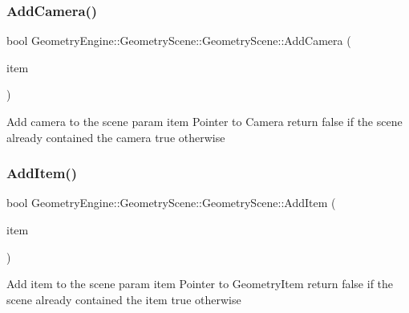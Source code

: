 \subsubsection{\texorpdfstring{AddCamera()}{AddCamera()}}
{\footnotesize\ttfamily bool Geometry\+Engine\+::\+Geometry\+Scene\+::\+Geometry\+Scene\+::\+Add\+Camera (\begin{DoxyParamCaption}\item[{\mbox{\hyperlink{class_geometry_engine_1_1_geometry_world_item_1_1_geometry_camera_1_1_camera}{Geometry\+World\+Item\+::\+Geometry\+Camera\+::\+Camera}} $\ast$}]{item }\end{DoxyParamCaption})\hspace{0.3cm}{\ttfamily [virtual]}}

Add camera to the scene param item Pointer to Camera return false if the scene already contained the camera true otherwise \mbox{\label{class_geometry_engine_1_1_geometry_scene_1_1_geometry_scene_a31a1d878b18e5e9fe4cc4aebeb3de415}} 
\subsubsection{\texorpdfstring{AddItem()}{AddItem()}}
{\footnotesize\ttfamily bool Geometry\+Engine\+::\+Geometry\+Scene\+::\+Geometry\+Scene\+::\+Add\+Item (\begin{DoxyParamCaption}\item[{\mbox{\hyperlink{class_geometry_engine_1_1_geometry_world_item_1_1_geometry_item_1_1_geometry_item}{Geometry\+World\+Item\+::\+Geometry\+Item\+::\+Geometry\+Item}} $\ast$}]{item }\end{DoxyParamCaption})\hspace{0.3cm}{\ttfamily [virtual]}}

Add item to the scene param item Pointer to Geometry\+Item return false if the scene already contained the item true otherwise \mbox{\label{class_geometry_engine_1_1_geometry_scene_1_1_geometry_scene_adde250133889e145473064d276e96583}} 
